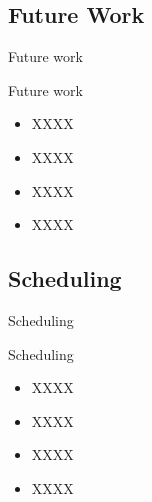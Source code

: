 \subsection{Future Work}

\begin{frame}{Future work}
  \begin{block}{Future work}
    \begin{itemize}
      \setlength{\itemsep}{6pt}
      \item XXXX
      \item XXXX
      \item XXXX
      \item XXXX
    \end{itemize}
  \end{block}
\end{frame}

\subsection{Scheduling}

\begin{frame}{Scheduling}
  \begin{block}{Scheduling}
    \begin{itemize}
      \setlength{\itemsep}{6pt}
      \item XXXX\cite{webster2010}
      \item XXXX\cite{jones2006}
      \item XXXX\cite{mcmahan2005}
      \item XXXX\cite{Gravagne2003}
    \end{itemize}
  \end{block}
\end{frame}
